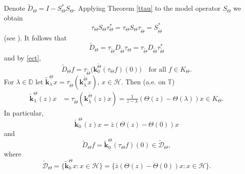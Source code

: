 \documentclass[11pt]{amsart}
\numberwithin{equation}{section}
\newcommand{\hsp}{\mathcal{H}}
\newcommand{\ke}{{\mathbf{k}}}
\theoremstyle{definition}
\numberwithin{equation}{section}
\begin{document}
Denote
$\widetilde{D}_{\Theta}= I - S_{\Theta}^*S_{\Theta}.$
Applying Theorem \ref{ttau} to the model operator $S_{\Theta}$ we obtain
\begin{equation}\label{sz}
\tau_{\Theta}S_{\Theta}\tau_{\Theta}^*=\tau_{\Theta}S_{\Theta}\tau_{\widetilde{\Theta}}=S_{\widetilde{\Theta}}^*
\end{equation}
(see \cite[p. 1001]{KT}). It follows that
\begin{equation}\label{ddd}
\widetilde{D}_{\Theta}=\tau_{\widetilde{\Theta}}{D}_{\widetilde{\Theta}}\tau_{\Theta}=\tau_{\widetilde{\Theta}}{D}_{\widetilde{\Theta}}\tau_{\widetilde{\Theta}}^*
\end{equation}
and by \eqref{ect},
$$\widetilde{D}_{\Theta}f=\tau_{\widetilde{\Theta}}\big(\ke_0^{\widetilde{\Theta}}(\tau_{\Theta}f)(0)\big)\quad\text{for all }f\in K_{\Theta}.$$
For $\lambda\in\mathbb{D}$ let $\widetilde{\ke}_{\lambda}^{\Theta}x=\tau_{\widetilde{\Theta}}(\ke_{\bar\lambda}^{\widetilde{\Theta}}x)$, $x\in\hsp$. Then (a.e. on $\mathbb{T}$)
\begin{align*}
\widetilde{\ke}_{\lambda}^{\Theta}(z)x&=\tau_{\widetilde{\Theta}}(\ke_{\bar\lambda}^{\widetilde{\Theta}}(z)x)
=\tfrac{1}{z-\lambda}(\Theta(z)-{\Theta}( \lambda))x\in K_{\Theta}.
\end{align*}
In particular,
$$\widetilde{\ke}_{0}^{\Theta}(z)x=\bar z(\Theta(z)-{\Theta}(0))x$$
and
$$\widetilde{D}_{\Theta}f=\widetilde{\ke}_0^{{\Theta}}(\tau_{\Theta}f)(0)\in\widetilde{\mathcal{D}}_{\Theta},$$
where
$$\widetilde{\mathcal{D}}_{\Theta}=\{ \widetilde{\ke}_0^{{\Theta}}x: x\in \hsp\}=\{ \bar{z}(\Theta(z)-\Theta(0))x: x\in \hsp\}.$$
\end{document}

